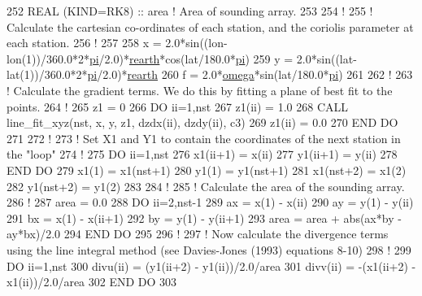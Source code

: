 \begin{DoxyCode}
252 \textcolor{keywordtype}{REAL (KIND=RK8)}                               :: area                 \textcolor{comment}{! Area of sounding array.}
253 
254 \textcolor{comment}{!}
255 \textcolor{comment}{! Calculate the cartesian co-ordinates of each station, and the coriolis parameter at each station.}
256 \textcolor{comment}{!}
257 
258 x   = 2.0*sin((lon-lon(1))/360.0*2*\hyperlink{namespaceconstants_a064bd715409f723a4e6d45b6300c5ca0}{pi}/2.0)*\hyperlink{namespaceconstants_afaa5eaa2c9ee648a808fb8e1c94e76f8}{rearth}*cos(lat/180.0*\hyperlink{namespaceconstants_a064bd715409f723a4e6d45b6300c5ca0}{pi})
259 y   = 2.0*sin((lat-lat(1))/360.0*2*\hyperlink{namespaceconstants_a064bd715409f723a4e6d45b6300c5ca0}{pi}/2.0)*\hyperlink{namespaceconstants_afaa5eaa2c9ee648a808fb8e1c94e76f8}{rearth}
260 f   = 2.0*\hyperlink{namespaceconstants_a67051296d7b4bcd0d4cee08bba6e46fa}{omega}*sin(lat/180.0*\hyperlink{namespaceconstants_a064bd715409f723a4e6d45b6300c5ca0}{pi})
261 
262 \textcolor{comment}{!}
263 \textcolor{comment}{! Calculate the gradient terms. We do this by fitting a plane of best fit to the points.}
264 \textcolor{comment}{!}
265 z1  = 0
266 \textcolor{keywordflow}{DO} ii=1,nst
267     z1(ii)   = 1.0
268     \textcolor{keyword}{CALL }line\_fit\_xyz(nst, x, y, z1, dzdx(ii), dzdy(ii), c3)
269     z1(ii)   = 0.0
270 \textcolor{keywordflow}{END DO}
271 
272 \textcolor{comment}{!}
273 \textcolor{comment}{! Set X1 and Y1 to contain the coordinates of the next station in the "loop"}
274 \textcolor{comment}{!}
275 \textcolor{keywordflow}{DO} ii=1,nst
276     x1(ii+1)    = x(ii)
277     y1(ii+1)    = y(ii)
278 \textcolor{keywordflow}{END DO}
279 x1(1)       = x1(nst+1)
280 y1(1)       = y1(nst+1)
281 x1(nst+2)   = x1(2)
282 y1(nst+2)   = y1(2)
283 
284 \textcolor{comment}{!}
285 \textcolor{comment}{! Calculate the area of the sounding array.}
286 \textcolor{comment}{!}
287 area        = 0.0
288 \textcolor{keywordflow}{DO} ii=2,nst-1
289     ax      = x(1) - x(ii)
290     ay      = y(1) - y(ii)
291     bx      = x(1) - x(ii+1)
292     by      = y(1) - y(ii+1)
293     area    = area + abs(ax*by - ay*bx)/2.0
294 \textcolor{keywordflow}{END DO}
295 
296 \textcolor{comment}{!}
297 \textcolor{comment}{! Now calculate the divergence terms using the line integral method (see Davies-Jones (1993) equations
       8-10)}
298 \textcolor{comment}{!}
299 \textcolor{keywordflow}{DO} ii=1,nst
300     divu(ii)    = (y1(ii+2) - y1(ii))/2.0/area
301     divv(ii)    = -(x1(ii+2) - x1(ii))/2.0/area
302 \textcolor{keywordflow}{END DO}
303 
\end{DoxyCode}


